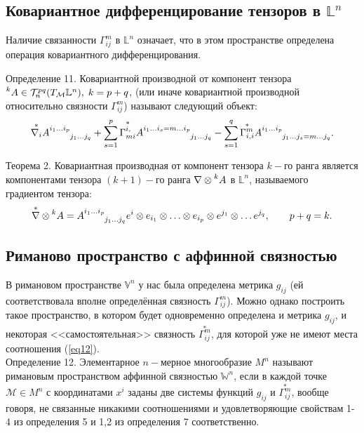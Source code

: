 \documentclass[14pt,a4paper]{scrartcl}
\begin{document}
\subsection{Ковариантное дифференцирование тензоров в $\mathbb{L}^n$}
Наличие связанности $\Gamma_{ij}^m$ в $\mathbb{L}^n$ означает, что в этом пространстве определена операция ковариантного дифференцирования.

Определение 11. Ковариантной производной от компонент тензора $\prescript{k}{}{A} \in \mathcal{T}_n^{pq}(T_{\mathcal{M}}\mathbb{L}^n), \; k=p+q$, (или иначе ковариантной производной относительно связности $\Gamma_{ij}^m$) называют следующий объект:
\begin{equation}\label{eq25}
	\overset{*}{\nabla_i}A\indices{^{i_1 \ldots i_p}_{j_1 \ldots j_q}} + \sum\limits_{s = 1}^p \overset{*}{\Gamma_{mi}^{i,}} A\indices{^{i_1 \ldots i_s = m \ldots i_p}_{j_1 \ldots j_q}} - \sum\limits_{s=1}^q \overset{*}{\Gamma_{i,i}^{m}} A\indices{^{i_1 \ldots i_p}_{j_1 \ldots j_s = m \ldots j_q}}.
\end{equation}


Теорема 2. Ковариантная производная от компонент тензора $k-$го ранга является компонентами тензора $(k+1)-$го ранга $\nabla \otimes \prescript{k}{}{A}$ в $\mathbb{L}^n$, называемого градиентом тензора:
\begin{equation}\label{eq26}
	\overset{*}{\nabla} \otimes \prescript{k}{}{A} = A\indices{^{i_1 \ldots i_p}_{j_1 \ldots j_q}} e^i \otimes e_{i_1} \otimes \ldots \otimes e_{i_p} \otimes e^{j_1} \otimes \ldots e^{j_q}, \qquad p+q=k.
\end{equation}

\subsection{Риманово пространство с аффинной связностью}
В римановом пространстве $\mathbb{V}^n$ у нас была определена метрика $g_{ij}$ (ей соответствовала вполне определённая связность $\Gamma_{ij}^m$). Можно однако построить такое пространство, в котором будет одновременно определена и метрика $g_{ij}$, и некоторая <<самостоятельная>> связность  $\overset{*}{\Gamma_{ij}^m}$, для которой уже не имеют места соотношения (\ref{eq12}).\\

Определение 12. Элементарное $n-$мерное многообразие $M^n$ называют римановым пространством аффинной связностью $\mathbb{W}^n$, если в каждой точке $\mathcal{M} \in M^n$ с координатами $x^i$ заданы две системы функций $g_{ij}$ и $\overset{*}{\Gamma_{ij}^m}$, вообще говоря, не связанные никакими соотношениями и удовлетворяющие свойствам 1-4 из определения 5 и 1,2 из определения 7 соответственно.
\end{document}
